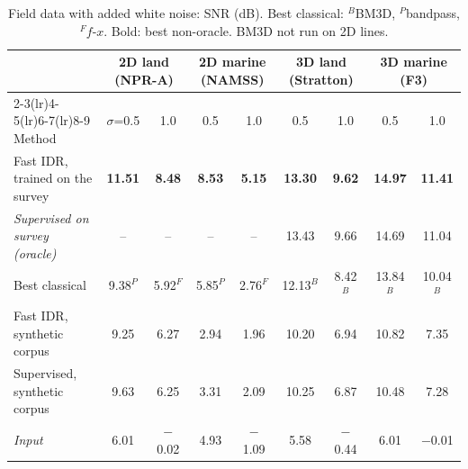 \begin{table}[!t]
\centering
\caption{Field data with added white noise: SNR (dB). Best classical: $^B$BM3D, $^P$bandpass, $^F$$f$-$x$. Bold: best non-oracle. BM3D not run on 2D lines.}
\label{tab:field_semi}
\begin{tabular}{lcccccccc}
\toprule
& \multicolumn{2}{c}{2D land (NPR-A)} & \multicolumn{2}{c}{2D marine (NAMSS)} & \multicolumn{2}{c}{3D land (Stratton)} & \multicolumn{2}{c}{3D marine (F3)} \\
\cmidrule(lr){2-3}\cmidrule(lr){4-5}\cmidrule(lr){6-7}\cmidrule(lr){8-9}
Method & $\sigma$=0.5 & 1.0 & 0.5 & 1.0 & 0.5 & 1.0 & 0.5 & 1.0 \\
\midrule
Fast IDR, trained on the survey & \textbf{11.51} & \textbf{8.48} & \textbf{8.53} & \textbf{5.15} & \textbf{13.30} & \textbf{9.62} & \textbf{14.97} & \textbf{11.41} \\
\textit{Supervised on survey (oracle)} & -- & -- & -- & -- & 13.43 & 9.66 & 14.69 & 11.04 \\
Best classical & 9.38$^{P}$ & 5.92$^{F}$ & 5.85$^{P}$ & 2.76$^{F}$ & 12.13$^{B}$ & 8.42$^{B}$ & 13.84$^{B}$ & 10.04$^{B}$ \\
Fast IDR, synthetic corpus & 9.25 & 6.27 & 2.94 & 1.96 & 10.20 & 6.94 & 10.82 & 7.35 \\
Supervised, synthetic corpus & 9.63 & 6.25 & 3.31 & 2.09 & 10.25 & 6.87 & 10.48 & 7.28 \\
\textit{Input} & 6.01 & $-$0.02 & 4.93 & $-$1.09 & 5.58 & $-$0.44 & 6.01 & $-$0.01 \\
\bottomrule
\end{tabular}
\end{table}
